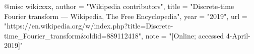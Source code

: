 @misc{ wiki:xxx,
    author = "{Wikipedia contributors}",
    title = "Discrete-time Fourier transform --- {Wikipedia}{,} The Free Encyclopedia",
    year = "2019",
    url = "https://en.wikipedia.org/w/index.php?title=Discrete-time_Fourier_transform&oldid=889112418",
    note = "[Online; accessed 4-April-2019]"
  }